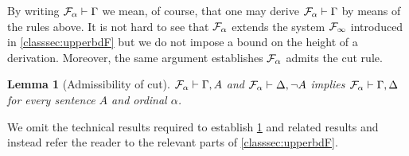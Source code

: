 \documentclass[UKenglish,cleveref,DIV=12]{scrartcl}
\newtheorem{lemma}{Lemma}
\theoremstyle{definition}
\theoremstyle{definition}
\begin{document}
By writing $\mathcal{F}_\alpha\vdash\Gamma$ we mean, of course, that one may derive $\mathcal{F}_\alpha\vdash\Gamma$ by means of the rules above. It is not hard to see that $\mathcal{F}_\alpha$ extends the system $\mathcal{F}_\infty$ introduced in \cref{classsec:upperbdF} but we do not impose a bound on the height of a derivation. Moreover, the same argument establishes $\mathcal{F}_\alpha$ admits the cut rule.
\begin{lemma}[Admissibility of cut]\label{extlem:FFCutAdd}
 $\mathcal{F}_\alpha\vdash\Gamma,A$ and $\mathcal{F}_\alpha\vdash\Delta,\lnot A$ implies $\mathcal{F}_\alpha\vdash \Gamma,\Delta$ for every sentence $A$ and ordinal $\alpha$.
\end{lemma}
We omit the technical results required to establish \cref{extlem:FFCutAdd} and related results and instead refer the reader to the relevant parts of \cref{classsec:upperbdF}.
\end{document}
